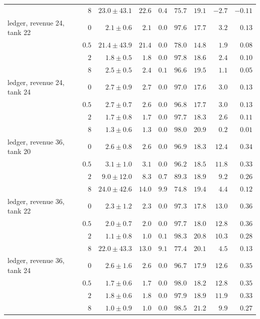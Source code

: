 \begin{tabular}{lrrrrrrrr}
 & $8$ & $23.0\pm43.1$ & $22.6$ & $0.4$ & $75.7$ & $19.1$ & $-2.7$ & $-0.11$ \\
\addlinespace
ledger, revenue 24, tank 22 & $0$ & $2.1\pm0.6$ & $2.1$ & $0.0$ & $97.6$ & $17.7$ & $3.2$ & $0.13$ \\
 & $0.5$ & $21.4\pm43.9$ & $21.4$ & $0.0$ & $78.0$ & $14.8$ & $1.9$ & $0.08$ \\
 & $2$ & $1.8\pm0.5$ & $1.8$ & $0.0$ & $97.8$ & $18.6$ & $2.4$ & $0.10$ \\
 & $8$ & $2.5\pm0.5$ & $2.4$ & $0.1$ & $96.6$ & $19.5$ & $1.1$ & $0.05$ \\
\addlinespace
ledger, revenue 24, tank 24 & $0$ & $2.7\pm0.9$ & $2.7$ & $0.0$ & $97.0$ & $17.6$ & $3.0$ & $0.13$ \\
 & $0.5$ & $2.7\pm0.7$ & $2.6$ & $0.0$ & $96.8$ & $17.7$ & $3.0$ & $0.13$ \\
 & $2$ & $1.7\pm0.8$ & $1.7$ & $0.0$ & $97.7$ & $18.3$ & $2.6$ & $0.11$ \\
 & $8$ & $1.3\pm0.6$ & $1.3$ & $0.0$ & $98.0$ & $20.9$ & $0.2$ & $0.01$ \\
\addlinespace
ledger, revenue 36, tank 20 & $0$ & $2.6\pm0.8$ & $2.6$ & $0.0$ & $96.9$ & $18.3$ & $12.4$ & $0.34$ \\
 & $0.5$ & $3.1\pm1.0$ & $3.1$ & $0.0$ & $96.2$ & $18.5$ & $11.8$ & $0.33$ \\
 & $2$ & $9.0\pm12.0$ & $8.3$ & $0.7$ & $89.3$ & $18.9$ & $9.2$ & $0.26$ \\
 & $8$ & $24.0\pm42.6$ & $14.0$ & $9.9$ & $74.8$ & $19.4$ & $4.4$ & $0.12$ \\
\addlinespace
ledger, revenue 36, tank 22 & $0$ & $2.3\pm1.2$ & $2.3$ & $0.0$ & $97.3$ & $17.8$ & $13.0$ & $0.36$ \\
 & $0.5$ & $2.0\pm0.7$ & $2.0$ & $0.0$ & $97.7$ & $18.0$ & $12.8$ & $0.36$ \\
 & $2$ & $1.1\pm0.8$ & $1.0$ & $0.1$ & $98.3$ & $20.8$ & $10.3$ & $0.28$ \\
 & $8$ & $22.0\pm43.3$ & $13.0$ & $9.1$ & $77.4$ & $20.1$ & $4.5$ & $0.13$ \\
\addlinespace
ledger, revenue 36, tank 24 & $0$ & $2.6\pm1.6$ & $2.6$ & $0.0$ & $96.7$ & $17.9$ & $12.6$ & $0.35$ \\
 & $0.5$ & $1.7\pm0.6$ & $1.7$ & $0.0$ & $98.0$ & $18.2$ & $12.8$ & $0.35$ \\
 & $2$ & $1.8\pm0.6$ & $1.8$ & $0.0$ & $97.9$ & $18.9$ & $11.9$ & $0.33$ \\
 & $8$ & $1.0\pm0.9$ & $1.0$ & $0.0$ & $98.5$ & $21.2$ & $9.9$ & $0.27$ \\

\end{tabular}
